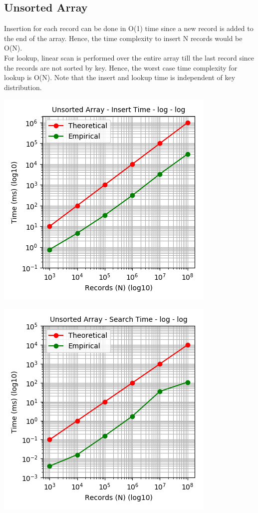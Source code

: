 \documentclass[11pt,a4paper,oneside]{article}
\begin{document}
	\subsection{Unsorted Array}
	Insertion for each record can be done in O(1) time since a new record is added to the end of the array. Hence, the time complexity to insert N records would be O(N). \\
	\newline
	For lookup, linear scan is performed over the entire array till the last record since the records are not sorted by key. Hence, the worst case time complexity for lookup is O(N). Note that the insert and lookup time is independent of key distribution.
	
	\begin{center}
		\includegraphics[scale=0.6]{3.png}		
	\end{center}
	
	\begin{center}
		\includegraphics[scale=0.6]{4.png}		
	\end{center}
\end{document}

